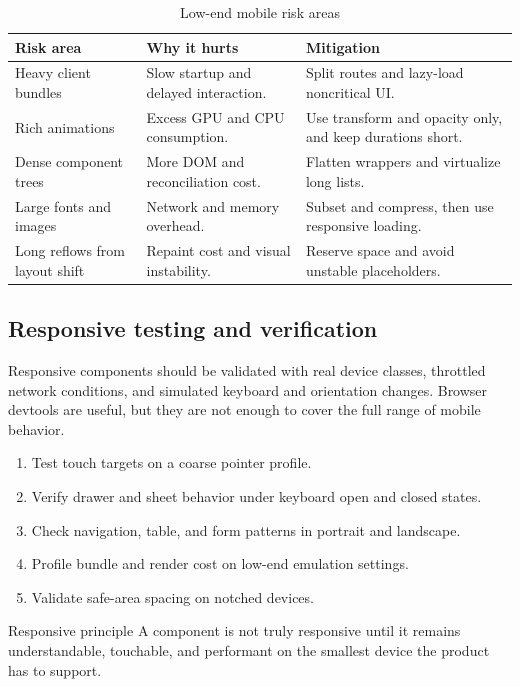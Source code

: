 \begin{table}[htbp]
  \centering
  \caption{Low-end mobile risk areas}
  \begin{tabularx}{\textwidth}{@{}p{}p{}Y@{}}
    \toprule
    \textbf{Risk area} & \textbf{Why it hurts} & \textbf{Mitigation} \\
    \midrule
    Heavy client bundles & Slow startup and delayed interaction. & Split routes and lazy-load noncritical UI. \\
    Rich animations & Excess GPU and CPU consumption. & Use transform and opacity only, and keep durations short. \\
    Dense component trees & More DOM and reconciliation cost. & Flatten wrappers and virtualize long lists. \\
    Large fonts and images & Network and memory overhead. & Subset and compress, then use responsive loading. \\
    Long reflows from layout shift & Repaint cost and visual instability. & Reserve space and avoid unstable placeholders. \\
    \bottomrule
  \end{tabularx}
\end{table}

\subsection{Responsive testing and verification}
Responsive components should be validated with real device classes, throttled network conditions, and simulated keyboard and orientation changes. Browser devtools are useful, but they are not enough to cover the full range of mobile behavior.

\begin{enumerate}[leftmargin=*, itemsep=0.35em]
  \item Test touch targets on a coarse pointer profile.
  \item Verify drawer and sheet behavior under keyboard open and closed states.
  \item Check navigation, table, and form patterns in portrait and landscape.
  \item Profile bundle and render cost on low-end emulation settings.
  \item Validate safe-area spacing on notched devices.
\end{enumerate}

\begin{highlightbox}{Responsive principle}
A component is not truly responsive until it remains understandable, touchable, and performant on the smallest device the product has to support.
\end{highlightbox}
